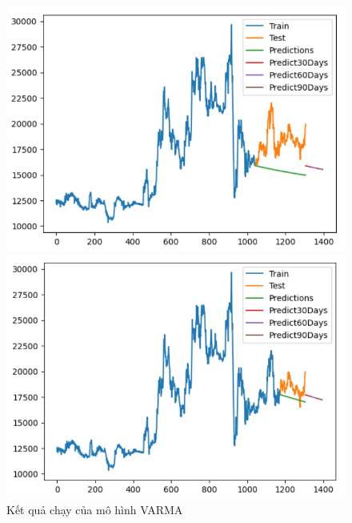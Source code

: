 \begin{figure}[H]
\begin{minipage}{0.15\textwidth}
    \includegraphics[width=1\textwidth]{resources/chapter-5/newdata1/result/EIB_VARMA_8-2.png}
    \end{minipage}
    \hfill
        \begin{minipage}{0.15\textwidth}
    \centering
    \includegraphics[width=1\textwidth]{resources/chapter-5/newdata1/result/EIB_VARMA_9-1.png}
    \end{minipage}
    \hfill
    
    \caption{Kết quả chạy của mô hình VARMA}
    \label{fig:varma_result}
\end{figure}


